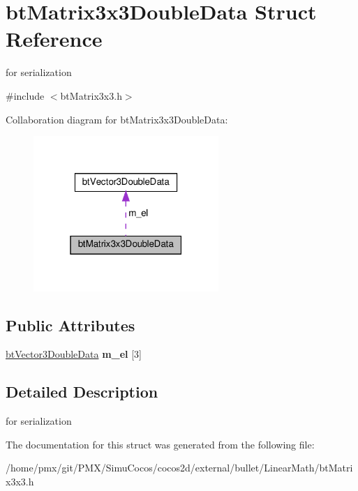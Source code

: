 \hypertarget{structbtMatrix3x3DoubleData}{}\section{bt\+Matrix3x3\+Double\+Data Struct Reference}
\label{structbtMatrix3x3DoubleData}


for serialization  




{\ttfamily \#include $<$bt\+Matrix3x3.\+h$>$}



Collaboration diagram for bt\+Matrix3x3\+Double\+Data\+:
\nopagebreak
\begin{figure}[H]
\begin{center}
\leavevmode
\includegraphics[width=199pt]{structbtMatrix3x3DoubleData__coll__graph}
\end{center}
\end{figure}
\subsection*{Public Attributes}
\begin{DoxyCompactItemize}
\item 
\mbox{\label{structbtMatrix3x3DoubleData_a3d69e28d7fd0ed5b3c9e7b50c07a748c}} 
\hyperlink{structbtVector3DoubleData}{bt\+Vector3\+Double\+Data} {\bfseries m\+\_\+el} \mbox{[}3\mbox{]}
\end{DoxyCompactItemize}


\subsection{Detailed Description}
for serialization 

The documentation for this struct was generated from the following file\+:\begin{DoxyCompactItemize}
\item 
/home/pmx/git/\+P\+M\+X/\+Simu\+Cocos/cocos2d/external/bullet/\+Linear\+Math/bt\+Matrix3x3.\+h\end{DoxyCompactItemize}
